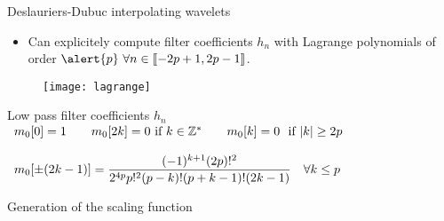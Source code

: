\begin{frame}{Deslauriers-Dubuc interpolating wavelets} 
    \footnotesize
    
    \begin{itemize}
        \item Can explicitely compute filter coefficients \alert{$h_n$} with Lagrange polynomials of order $\alert{p}\ \forall n \in \llbracket -2p+1, 2p-1 \rrbracket$.
    \end{itemize}
  
    \vskip 0.2cm
    \vskip -0.3cm
    \begin{figure}[H]
        \texttt{[image: lagrange]}
    \end{figure}

    \begin{block}{Low pass filter coefficients $h_n$}
    $
    \begin{array}{l cc c cc r}
        m_0[0] = 1 && 
        m_0[2k] = 0 \textrm { if } k \in \Z^* &&
        m_0[k] = 0 \textrm{ if } |k| \geq 2p& \\
        \\
        \multicolumn{7}{l}{
            m_0[\pm (2k-1)] = \dfrac{(-1)^{k+1}(2p)!^2}{2^{4p}p!^2(p-k)!(p+k-1)!(2k-1)}\ \ \ \forall k \leq p
    }
    \end{array}
    $
    \end{block}
\end{frame}

\begin{frame}{Generation of the scaling function} 
    
    \footnotesize
    
   
\end{frame}
    

